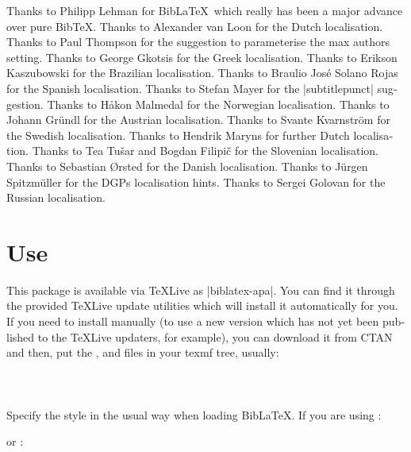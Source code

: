 \documentclass{ltxdockit}
\begin{document}
Thanks to Philipp Lehman for Bib\LaTeX\ which really has been a major
advance over pure Bib\TeX. Thanks to Alexander van Loon for the Dutch
localisation. Thanks to Paul Thompson for the suggestion to
parameterise the max authors setting. Thanks to George Gkotsis for the
Greek localisation. Thanks to Erikson Kaszubowski for the Brazilian
localisation. Thanks to Braulio José Solano Rojas for the Spanish
localisation. Thanks to Stefan Mayer for the |subtitlepunct| suggestion.
Thanks to Håkon Malmedal for the Norwegian localisation. Thanks to
Johann Gründl for the Austrian localisation. Thanks to Svante Kvarnström
for the Swedish localisation. Thanks to Hendrik Maryns for further Dutch
localisation. Thanks to Tea Tušar and Bogdan Filipič for the Slovenian
localisation. Thanks to Sebastian Ørsted for the Danish localisation.
Thanks to Jürgen Spitzmüller for the DGPs localisation hints. Thanks to
Sergei Golovan for the Russian localisation.

\section{Use}\label{ref:use}
\label{use}
This package is available via \TeX Live as |biblatex-apa|. You can find it
through the provided \TeX Live update utilities which will install it
automatically for you. If you need to install manually (to use a new
version which has not yet been published to the \TeX Live updaters, for
example), you can download it from CTAN and then, put the ,
 and  files in your texmf tree, usually:\\ 

\noindent{}\\
\\
\\

\noindent Specify the style in the usual way when loading Bib\LaTeX. If you
are using :

\begin{ltxcode}
\usepackage[american]{babel}
\usepackage{csquotes}
\usepackage[style=apa]{biblatex}
\end{ltxcode}

or :

\begin{ltxcode}
\usepackage{polyglossia}
\setdefaultlanguage[variant=american]{english}
\usepackage{csquotes}
\usepackage[style=apa]{biblatex}
\end{ltxcode}
\end{document}
